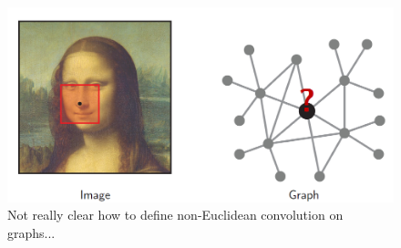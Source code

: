 \begin{figure}[H]
    \centering
    \includegraphics[width=.7\textwidth]{figures/12/monalisa-graph.png}
    \caption{Not really clear how to define non-Euclidean convolution on graphs...}
\end{figure}